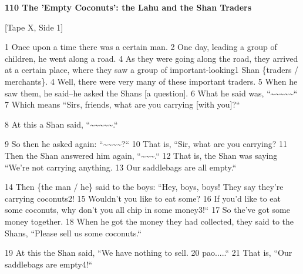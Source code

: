 
\textbf{110 The 'Empty Coconuts': the Lahu and the Shan Traders}

[Tape X, Side 1]

1 Once upon a time there was a certain man. 2 One day, leading a group of children,
he went along a road. 4 As they were going along the road, they arrived at a certain
place, where they saw a group of important-looking1 Shan \{traders / merchants\}.
4 Well, there were very many of these important traders. 5 When he saw them, he
said--he asked the Shans [a question]. 6 What he said was, ``\textasciitilde{}\textasciitilde{}\textasciitilde{}\textasciitilde{}\textasciitilde{}``
7 Which means ``Sirs, friends, what are you carrying [with you]?``

8 At this a Shan said, ``\textasciitilde{}\textasciitilde{}\textasciitilde{}\textasciitilde{}\textasciitilde{}.``

9 So then he asked again: ``\textasciitilde{}\textasciitilde{}\textasciitilde{}\textasciitilde{}?``
10 That is, ``Sir, what are you carrying? 11 Then the Shan answered him
again, ``\textasciitilde{}\textasciitilde{}\textasciitilde{}.``
12 That is, the Shan was saying ``We're not carrying anything. 13 Our saddlebags
are all empty.``

14 Then \{the man / he\} said to the boys: ``Hey, boys, boys! They say
they're carrying coconuts2! 15 Wouldn't you like to eat some? 16 If you'd like
to eat some coconuts, why don't you all chip in some money3!`` 17 So the've
got some money together. 18 When he got the money they had collected, they said
to the Shans, ``Please sell us some coconuts.``

19 At this the Shan said, ``We have nothing to sell. 20 pao.....``
21 That is, ``Our saddlebags are empty4!``

